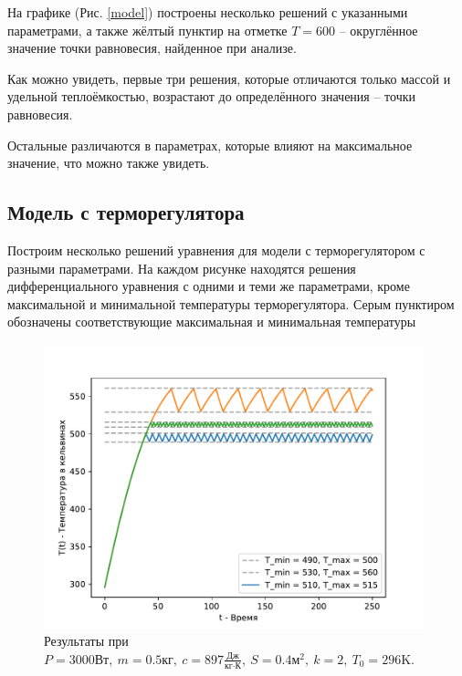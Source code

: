         На графике (Рис. \ref{model}) построены несколько решений с указанными параметрами, а также жёлтый пунктир на отметке $T = 600$ -- округлённое значение точки равновесия, найденное при анализе.
        
        Как можно увидеть, первые три решения, которые отличаются только массой и удельной теплоёмкостью, возрастают до определённого значения -- точки равновесия. 
        
        Остальные различаются в параметрах, которые влияют на максимальное значение, что можно также увидеть.
    
    \subsection{Модель с терморегулятора}
        Построим несколько решений уравнения для модели с терморегулятором с разными параметрами. На каждом рисунке находятся решения дифференциального уравнения с одними и теми же параметрами, кроме максимальной и минимальной температуры терморегулятора. Серым пунктиром обозначены соответствующие максимальная и минимальная температуры


        \begin{figure}[H]
            \centering
            \includegraphics[width=11cm]{pictures/utug2.pdf}
            \caption{Результаты при $P = 3000 \text{Вт}, ~ m = 0.5 \text{кг}, ~ c = 897 \frac{\text{Дж}}{\text{кг} \cdot \text{К}}, ~ S = 0.4 \text{м}^2, ~ k = 2, ~ T_0 = 296 \text{K}$.} \label{t1}
        \end{figure}


